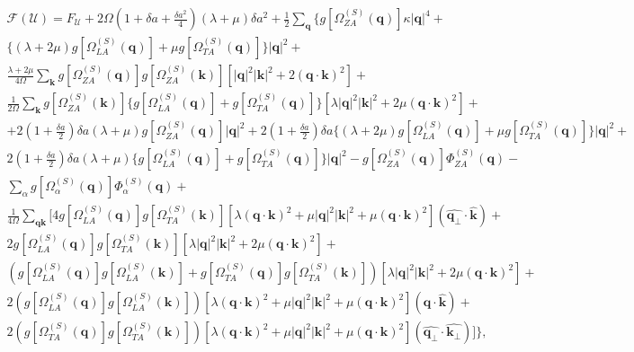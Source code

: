 \begin{multline}
\label{scha-f}
 \mathcal{F}(\mathcal{U})=F_{\mathcal{U}}+2\Omega(1+\delta a+\frac{\delta a^{2}}{4})(\lambda+\mu)\delta a^{2}+\frac{1}{2}\sum_{\boldsymbol{q}}\{g[\Omega_{ZA}^{(S)}(\boldsymbol{q})]\kappa|\boldsymbol{q}|^{4}+\\\{(\lambda+2\mu)
 g[\Omega_{LA}^{(S)}(\boldsymbol{q})]+\mu g[\Omega_{TA}^{(S)}(\boldsymbol{q})]\}|\boldsymbol{q}|^{2}+\\\frac{\lambda+2\mu}{4\Omega}\sum_{\boldsymbol{k}}g[\Omega_{ZA}^{(S)}(\boldsymbol{q})]g[\Omega_{ZA}^{(S)}(\boldsymbol{
 k})][|\boldsymbol{q}|^{2}|\boldsymbol{k}|^{2}+2(\boldsymbol{q}\cdot\boldsymbol{k})^{2}]+\\\frac{1}{2\Omega}\sum_{\boldsymbol{k}}g[\Omega_{ZA}^{(S)}(\boldsymbol{k})]\{g[\Omega_{LA}^{(S)}(\boldsymbol{q})]+g[\Omega_{TA}^{(S)}(
 \boldsymbol{q})]\}[\lambda|\boldsymbol{q}|^{2}|\boldsymbol{k}|^{2}+2\mu(\boldsymbol{q}\cdot\boldsymbol{k})^{2}]+\\+2(1+\frac{\delta a}{2})\delta a(\lambda+\mu)g[\Omega_{ZA}^{(S)}(\boldsymbol{q})]|\boldsymbol{q}|^{2}+2(1+\frac{
 \delta a}{2})\delta a\{(\lambda+2\mu)g[\Omega_{LA}^{(S)}(\boldsymbol{q})]+\mu g[\Omega_{TA}^{(S)}(\boldsymbol{q})]\}|\boldsymbol{q}|^{2}+\\2(1+\frac{\delta a}{2})\delta a(\lambda+\mu)\{g[\Omega_{LA}^{(S)}(\boldsymbol{
 q})]+g[\Omega_{TA}^{(S)}(\boldsymbol{q})]\}|\boldsymbol{q}|^{2}-g[\Omega_{ZA}^{(S)}(\boldsymbol{q})]\Phi_{ZA}^{(S)}(\boldsymbol{q})-\\\sum_{\alpha}g[\Omega_{\alpha}^{(S)}(\boldsymbol{q})]\Phi_{\alpha}^{(S)}(\boldsymbol{q})+ \\
 \frac{1}{4\Omega}\sum_{\boldsymbol{q}\boldsymbol{k}}[4g[\Omega_{LA}^{(S)}(
 \boldsymbol{q})]g[\Omega_{TA}^{(S)}(\boldsymbol{k})][\lambda(\boldsymbol{q}\cdot\boldsymbol{k})^{2}+\mu|\boldsymbol{q}|^{2}|\boldsymbol{k}|^{2}+\mu(\boldsymbol{q}\cdot\boldsymbol{k})^{2}](\hat{\boldsymbol{q}_{\perp}}\cdot\hat{
 \boldsymbol{k}})+ \\ 2g[\Omega_{LA}^{(S)}(\boldsymbol{q})]g[\Omega_{TA}^{(S)}(\boldsymbol{k})][\lambda|\boldsymbol{q}|^{2}|\boldsymbol{k}|^{2}+2\mu(\boldsymbol{q}\cdot\boldsymbol{k})^{2}]+ \\ (g[\Omega_{LA}^{(S)}(
 \boldsymbol{q})]g[\Omega_{LA}^{(S)}(\boldsymbol{k})]+g[\Omega_{TA}^{(S)}(\boldsymbol{q})]g[\Omega_{TA}^{(S)}(\boldsymbol{k})])[\lambda|\boldsymbol{q}|^{2}|\boldsymbol{k}|^{2}+2\mu(\boldsymbol{q}\cdot\boldsymbol{k})^{2}]+
 \\2(g[\Omega_{LA}^{(S)}(\boldsymbol{q})]g[\Omega_{LA}^{(S)}(\boldsymbol{k})])[\lambda(\boldsymbol{q}\cdot\boldsymbol{k})^{2}+\mu|\boldsymbol{q}|^{2}|\boldsymbol{k}|^{2}+\mu(\boldsymbol{q}\cdot\boldsymbol{k})^{2}](\hat{
 \boldsymbol{q}}\cdot\hat{\boldsymbol{k}}) + \\ 2(g[\Omega_{TA}^{(S)}(\boldsymbol{q})]g[\Omega_{TA}^{(S)}(\boldsymbol{k})])[\lambda(\boldsymbol{q}\cdot\boldsymbol{k})^{2}+\mu|\boldsymbol{q}|^{2}|\boldsymbol{k}|^{2}+\mu(
 \boldsymbol{q}\cdot\boldsymbol{k})^{2}](\hat{\boldsymbol{q}_{\perp}}\cdot\hat{\boldsymbol{k}_{\perp}})] \},
\end{multline}
